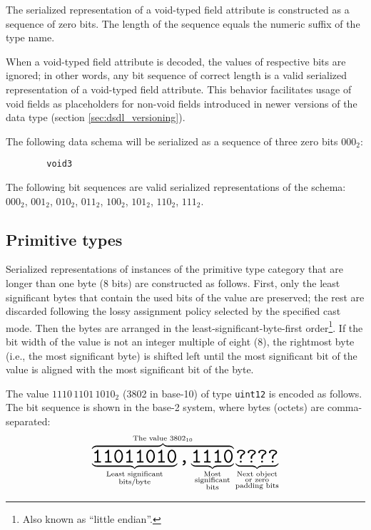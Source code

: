 The serialized representation of a void-typed field attribute is constructed as a sequence of zero bits.
The length of the sequence equals the numeric suffix of the type name.

When a void-typed field attribute is decoded, the values of respective bits are ignored;
in other words, any bit sequence of correct length is a valid serialized representation
of a void-typed field attribute.
This behavior facilitates usage of void fields as placeholders for non-void fields
introduced in newer versions of the data type (section \ref{sec:dsdl_versioning}).

\begin{remark}
    The following data schema will be serialized as a sequence of three zero bits $000_2$:
    \begin{verbatim}
        void3
    \end{verbatim}
    The following bit sequences are valid serialized representations of the schema:
    $000_2$,
    $001_2$,
    $010_2$,
    $011_2$,
    $100_2$,
    $101_2$,
    $110_2$,
    $111_2$.
\end{remark}

\subsection{Primitive types}

Serialized representations of instances of the primitive type category that are longer than one byte (8 bits)
are constructed as follows.
First, only the least significant bytes that contain the used bits of the value are preserved;
the rest are discarded following the lossy assignment policy selected by the specified cast mode.
Then the bytes are arranged in the least-significant-byte-first order\footnote{Also known as ``little endian''.}.
If the bit width of the value is not an integer multiple of eight (8),
the rightmost byte (i.e., the most significant byte) is shifted left until the most significant bit of the value
is aligned with the most significant bit of the byte.

\begin{remark}
    The value $1110\,1101\,1010_2$ (3802 in base-10) of type \verb|uint12| is encoded as follows.
    The bit sequence is shown in the base-2 system, where bytes (octets) are comma-separated:
    $$
        \overbrace{%
            \underbrace{\hugett{11011010}}_{\substack{\text{Least significant} \\ \text{bits/byte}}}%
            \hugett{,}%
            \underbrace{\hugett{1110}}_{\substack{\text{Most} \\ \text{significant} \\ \text{bits}}}%
        }^{\text{The value }3802_{10}}%
        \underbrace{\hugett{????}}_{\substack{\text{Next object} \\ \text{or zero} \\ \text{padding bits}}}
    $$
\end{remark}

